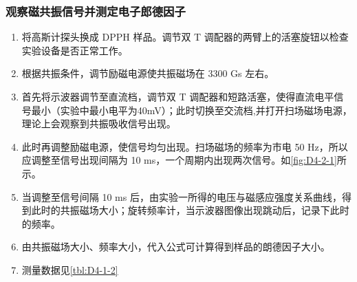 \documentclass[dvipsnames, svgnames,a4paper,11pt]{article}
\begin{document}
		\begin{table}[ht]
			\centering
			\caption{励磁电压与磁感应强度关系}
			\label{tbl:D4-1-1}
		\end{table}


	\subsubsection{观察磁共振信号并测定电子郎德因子}

		\begin{enumerate}
			\item 将高斯计探头换成 DPPH 样品。调节双 T 调配器的两臂上的活塞旋钮以检查实验设备是否正常工作。
			\item 根据共振条件，调节励磁电源使共振磁场在 3300 Gs 左右。
			\item 首先将示波器调节至直流档，调节双 T 调配器和短路活塞，使得直流电平信号最小（实验中最小电平为40mV）；此时切换至交流档,并打开扫场磁场电源，理论上会观察到共振吸收信号出现。
			\item 此时再调整励磁电源，使信号均匀出现。扫场磁场的频率为市电 50 Hz，所以应调整至信号出现间隔为 10 ms，一个周期内出现两次信号。如\cref{fig:D4-2-1}所示。
			\item 当调整至信号间隔 10 ms 后，由实验一所得的电压与磁感应强度关系曲线，得到此时的共振磁场大小；旋转频率计，当示波器图像出现跳动后，记录下此时的频率。
			\item 由共振磁场大小、频率大小，代入公式可计算得到样品的朗德因子大小。
			\item 测量数据见\cref{tbl:D4-1-2}
		\end{enumerate}
\end{document}
